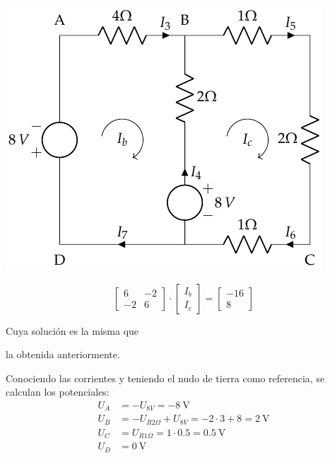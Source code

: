 \documentclass[10pt]{article}
\begin{document}
\vspace{4mm}
\begin{minipage}{0.6\linewidth}
    \begin{center}
    \includegraphics[scale=1.1]{figs/BT1_11_mod2.pdf}
    \end{center}
\end{minipage}
\begin{minipage}{0.4\linewidth}
    \begin{equation*}
      \begin{bmatrix}
        6 & -2  \\
        -2 & 6
      \end{bmatrix} \cdot
      \begin{bmatrix}
        I_b\\
        I_c
      \end{bmatrix} = %
      \begin{bmatrix}
        -16\\
        8
      \end{bmatrix}
    \end{equation*}

    \vspace{10mm}
    
    Cuya solución es la misma que 
    
    la obtenida anteriormente.
\end{minipage}

Conociendo las corrientes y teniendo el nudo de tierra como referencia, se calculan los potenciales:
\begin{align*}
  U_A&=-U_{8V}= \boxed{\qty{-8}{\volt}}\\
  U_B&=-U_{R2\Omega}+U_{8V}=-2\cdot 3+8= \boxed{\qty{2}{\volt}}\\
  U_C&=U_{R1\Omega}=1\cdot 0.5= \boxed{\qty{0.5}{\volt}}\\
  U_D&= \boxed{\qty{0}{\volt}}
\end{align*}
\end{document}
